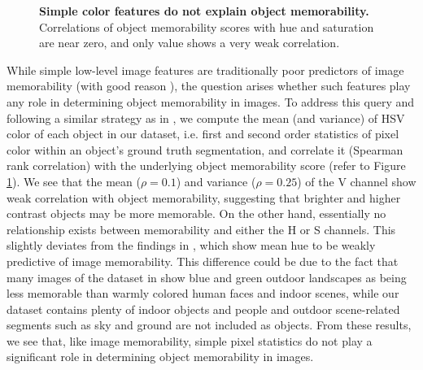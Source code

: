 \begin{figure}[!htb]
\centering
{}
\vspace{-5mm}\caption{\footnotesize\textbf{Simple color features do not explain object memorability.} Correlations of object memorability scores with hue and saturation are near zero, and only value shows a very weak correlation.}\label{fig:simple}
\end{figure}

While simple low-level image features are traditionally poor
predictors of image memorability \cite{isola11} (with good reason
\cite{konkle10}), the question arises whether such features play any
role in determining object memorability in images. To address this
query and following a similar strategy as in \cite{isola11,isola14},
we compute the mean (and variance) of HSV color of each object in our
dataset, i.e. first and second order  statistics of pixel color within
an object's ground truth segmentation, and correlate it (Spearman rank
correlation) with the underlying object memorability score (refer to
Figure \ref{fig:simple}). We see that the mean ($\rho = 0.1$) and
variance ($\rho=0.25$) of the V channel show weak correlation with
object memorability, suggesting that brighter and higher contrast
objects may be more memorable. On the other hand, essentially no
relationship exists between memorability and either the H or S
channels. This slightly deviates from the findings in \cite{isola11},
which show mean hue to be weakly predictive of image
memorability. This difference could be due to the fact that many
images of the dataset in \cite{isola11} show blue and green outdoor
landscapes as being less memorable than warmly colored human faces and
indoor scenes, while our dataset contains plenty of indoor objects and
people and outdoor scene-related segments such as sky and ground are
not included as objects. From these results, we see that, like image
memorability, simple pixel statistics do not play a significant role
in determining object memorability in images.

